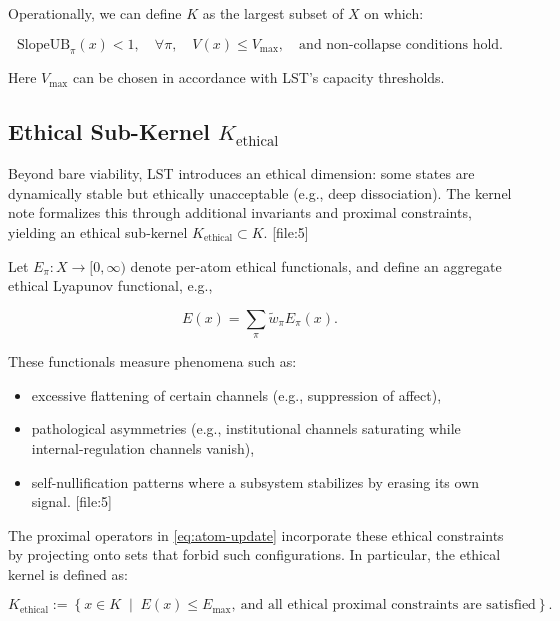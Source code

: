 \documentclass[11pt]{article}
\begin{document}
Operationally, we can define \(K\) as the largest subset of \(X\) on which:

\begin{equation}
  \text{SlopeUB}_\pi(x) < 1,\quad \forall \pi,\quad V(x) \leq V_{\max},\quad \text{and non-collapse conditions hold.}
  \label{eq:K-def}
\end{equation}

Here \(V_{\max}\) can be chosen in accordance with LST's capacity thresholds.

\subsection{Ethical Sub-Kernel \(K_{\text{ethical}}\)}

Beyond bare viability, LST introduces an ethical dimension: some states are dynamically stable but ethically unacceptable (e.g., deep dissociation). The kernel note formalizes this through additional invariants and proximal constraints, yielding an ethical sub-kernel \(K_{\text{ethical}}\subset K\). [file:5]

Let \(E_\pi:X\to [0,\infty)\) denote per-atom ethical functionals, and define an aggregate ethical Lyapunov functional, e.g.,

\[
  E(x) = \sum_{\pi} \tilde{w}_\pi E_\pi(x).
\]

These functionals measure phenomena such as:

\begin{itemize}[leftmargin=*]
  \item excessive flattening of certain channels (e.g., suppression of affect),
  \item pathological asymmetries (e.g., institutional channels saturating while internal-regulation channels vanish),
  \item self-nullification patterns where a subsystem stabilizes by erasing its own signal. [file:5]
\end{itemize}

The proximal operators in \eqref{eq:atom-update} incorporate these ethical constraints by projecting onto sets that forbid such configurations. In particular, the ethical kernel is defined as:

\begin{equation}
  K_{\text{ethical}} := \left\{ x\in K \;\middle|\; E(x) \leq E_{\max},\ \text{and all ethical proximal constraints are satisfied} \right\}.
  \label{eq:K-ethical}
\end{equation}
\end{document}
